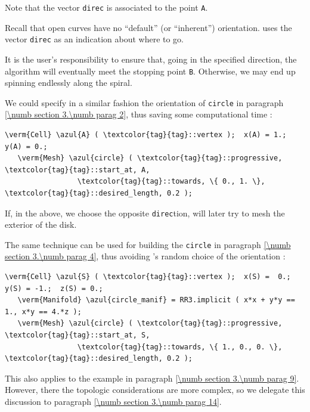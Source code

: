 Note that the vector {\small\tt direc} is associated to the point {\small\tt A}.

Recall that open curves have no ``default'' (or ``inherent'') orientation.
{\ManiFEM} uses the vector {\small\tt direc} as an indication about where to go.

It is the user's responsibility to ensure that, going in the specified direction,
the algorithm will eventually meet the stopping point {\small\tt B}.
Otherwise, we may end up spinning endlessly along the spiral.

We could specify in a similar fashion the orientation of {\small\tt circle} in paragraph
\ref{\numb section 3.\numb parag 2}, thus saving some computational time :

\begin{Verbatim}[commandchars=\\\{\},formatcom=\small\tt,
   baselinestretch=0.94,framesep=2mm                     ]
   \verm{Cell} \azul{A} ( \textcolor{tag}{tag}::vertex );  x(A) = 1.;  y(A) = 0.;
   \verm{Mesh} \azul{circle} ( \textcolor{tag}{tag}::progressive, \textcolor{tag}{tag}::start_at, A,
                 \textcolor{tag}{tag}::towards, \{ 0., 1. \}, \textcolor{tag}{tag}::desired_length, 0.2 );
\end{Verbatim}

If, in the above, we choose the opposite {\small\tt direc}tion,
{\maniFEM} will later try to mesh the exterior of the disk.

The same technique can be used for building the {\small\tt circle} in paragraph
\ref{\numb section 3.\numb parag 4}, thus avoiding \maniFEM's random choice of the orientation :

\begin{Verbatim}[commandchars=\\\{\},formatcom=\small\tt,
   baselinestretch=0.94,framesep=2mm                     ]
   \verm{Cell} \azul{S} ( \textcolor{tag}{tag}::vertex );  x(S) =  0.;   y(S) = -1.;  z(S) = 0.;
   \verm{Manifold} \azul{circle_manif} = RR3.implicit ( x*x + y*y == 1., x*y == 4.*z );
   \verm{Mesh} \azul{circle} ( \textcolor{tag}{tag}::progressive, \textcolor{tag}{tag}::start_at, S,
                 \textcolor{tag}{tag}::towards, \{ 1., 0., 0. \}, \textcolor{tag}{tag}::desired_length, 0.2 );
\end{Verbatim}

This also applies to the example in paragraph \ref{\numb section 3.\numb parag 9}.
However, there the topologic considerations are more complex, so we delegate this
discussion to paragraph \ref{\numb section 3.\numb parag 14}.


